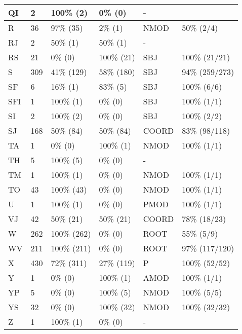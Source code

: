 \begin{figure*}
\begin{tabular}{|l|l|l|l||l|l|}
\hline
 QI & 2 & 100\% (2) & 0\% (0) & - &  \\ 
\hline
 R & 36 & 97\% (35) & 2\% (1) & NMOD & 50\% (2/4) \\ 
\hline
 RJ & 2 & 50\% (1) & 50\% (1) & - &  \\ 
\hline
 RS & 21 & 0\% (0) & 100\% (21) & SBJ & 100\% (21/21) \\ 
\hline
 S & 309 & 41\% (129) & 58\% (180) & SBJ & 94\% (259/273) \\ 
\hline
 SF & 6 & 16\% (1) & 83\% (5) & SBJ & 100\% (6/6) \\ 
\hline
 SFI & 1 & 100\% (1) & 0\% (0) & SBJ & 100\% (1/1) \\ 
\hline
 SI & 2 & 100\% (2) & 0\% (0) & SBJ & 100\% (2/2) \\ 
\hline
 SJ & 168 & 50\% (84) & 50\% (84) & COORD & 83\% (98/118) \\ 
\hline
 TA & 1 & 0\% (0) & 100\% (1) & NMOD & 100\% (1/1) \\ 
\hline
 TH & 5 & 100\% (5) & 0\% (0) & - &  \\ 
\hline
 TM & 1 & 100\% (1) & 0\% (0) & NMOD & 100\% (1/1) \\ 
\hline
 TO & 43 & 100\% (43) & 0\% (0) & NMOD & 100\% (1/1) \\ 
\hline
 U & 1 & 100\% (1) & 0\% (0) & PMOD & 100\% (1/1) \\ 
\hline
 VJ & 42 & 50\% (21) & 50\% (21) & COORD & 78\% (18/23) \\ 
\hline
 W & 262 & 100\% (262) & 0\% (0) & ROOT & 55\% (5/9) \\ 
\hline
 WV & 211 & 100\% (211) & 0\% (0) & ROOT & 97\% (117/120) \\ 
\hline
 X & 430 & 72\% (311) & 27\% (119) & P & 100\% (52/52) \\ 
\hline
 Y & 1 & 0\% (0) & 100\% (1) & AMOD & 100\% (1/1) \\ 
\hline
 YP & 5 & 0\% (0) & 100\% (5) & NMOD & 100\% (5/5) \\ 
\hline
 YS & 32 & 0\% (0) & 100\% (32) & NMOD & 100\% (32/32) \\ 
\hline
 Z & 1 & 100\% (1) & 0\% (0) & - &  \\ 
\hline
\end{tabular}
\end{figure*}
